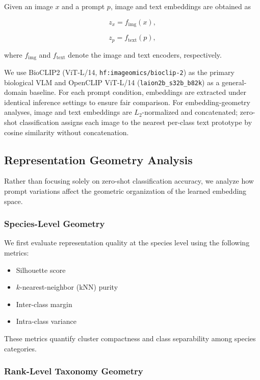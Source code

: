 Given an image $x$ and a prompt $p$, image and text embeddings are obtained as

\begin{equation}
z_x = f_{\mathrm{img}}(x),
\end{equation}

\begin{equation}
z_p = f_{\mathrm{text}}(p),
\end{equation}

where $f_{\mathrm{img}}$ and $f_{\mathrm{text}}$ denote the image and text encoders, respectively.

We use BioCLIP2 (ViT-L/14, \texttt{hf:imageomics/bioclip-2}) as the primary biological VLM and OpenCLIP ViT-L/14 (\texttt{laion2b\_s32b\_b82k}) as a general-domain baseline. For each prompt condition, embeddings are extracted under identical inference settings to ensure fair comparison. For embedding-geometry analyses, image and text embeddings are $L_2$-normalized and concatenated; zero-shot classification assigns each image to the nearest per-class text prototype by cosine similarity without concatenation.

\subsection{Representation Geometry Analysis}

Rather than focusing solely on zero-shot classification accuracy, we analyze how prompt variations affect the geometric organization of the learned embedding space.

\subsubsection{Species-Level Geometry}

We first evaluate representation quality at the species level using the following metrics:

\begin{itemize}
    \item Silhouette score
    \item $k$-nearest-neighbor (kNN) purity
    \item Inter-class margin
    \item Intra-class variance
\end{itemize}

These metrics quantify cluster compactness and class separability among species categories.

\subsubsection{Rank-Level Taxonomy Geometry}

